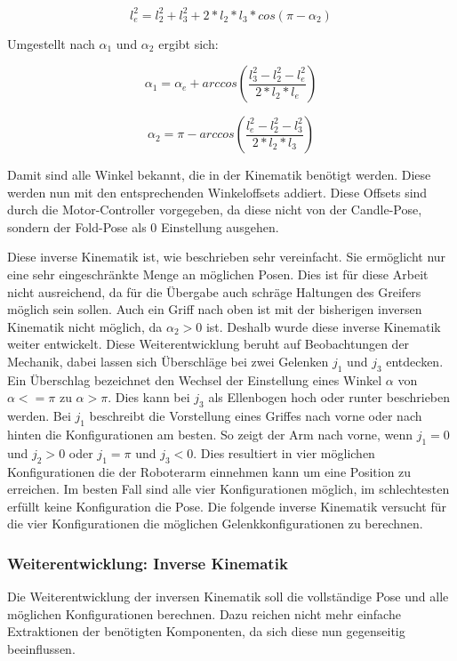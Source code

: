 \begin{equation}
l_{e}^2 = l_2^2 + l_3^2 + 2 * l_2 * l_3 * cos(\pi - \alpha_2)
\label{eq:12}
\end{equation}

Umgestellt nach $\alpha_1$ und $\alpha_2$ ergibt sich:

\begin{equation}
\alpha_1 = \alpha_{e} + arccos(\dfrac{l_3^2-l_2^2-l_{e}^2}{2*l_2*l_{e}})
\label{eq:13}
\end{equation}

\begin{equation}
\alpha_2 = \pi - arccos(\dfrac{l_{e}^2-l_2^2-l_{3}^2}{2*l_2*l_3})
\label{eq:14}
\end{equation}

Damit sind alle Winkel bekannt, die in der Kinematik benötigt werden. Diese werden nun mit den entsprechenden Winkeloffsets addiert. Diese Offsets sind durch die Motor-Controller vorgegeben, da diese nicht von der Candle-Pose, sondern der Fold-Pose als 0\textdegree{ } Einstellung ausgehen.

Diese inverse Kinematik ist, wie beschrieben sehr vereinfacht. Sie ermöglicht nur eine sehr eingeschränkte Menge an möglichen Posen. Dies ist für diese Arbeit nicht ausreichend, da für die Übergabe auch schräge Haltungen des Greifers möglich sein sollen. Auch ein Griff nach oben ist mit der bisherigen inversen Kinematik nicht möglich, da $\alpha_2 > 0$ ist. Deshalb wurde diese inverse Kinematik weiter entwickelt. Diese Weiterentwicklung beruht auf Beobachtungen der Mechanik, dabei lassen sich Überschläge bei zwei Gelenken $j_1$ und $j_3$ entdecken. Ein Überschlag bezeichnet den Wechsel der Einstellung eines Winkel $\alpha$ von $\alpha <= \pi$ zu $\alpha > \pi$. Dies kann bei $j_3$ als Ellenbogen hoch oder runter beschrieben werden. Bei $j_1$ beschreibt die Vorstellung eines Griffes nach vorne oder nach hinten die Konfigurationen am besten. So zeigt der Arm nach vorne, wenn $j_1 = 0$ und $j_2 > 0$ oder $j_1 = \pi$ und $j_3 < 0$. Dies resultiert in vier möglichen Konfigurationen die der Roboterarm einnehmen kann um eine Position zu erreichen. Im besten Fall sind alle vier Konfigurationen möglich, im schlechtesten erfüllt keine Konfiguration die Pose. Die folgende inverse Kinematik versucht für die vier Konfigurationen die möglichen Gelenkkonfigurationen zu berechnen.

\subsubsection{Weiterentwicklung: Inverse Kinematik}
Die Weiterentwicklung der inversen Kinematik soll die vollständige Pose und alle möglichen Konfigurationen berechnen. Dazu reichen nicht mehr einfache Extraktionen der benötigten Komponenten, da sich diese nun gegenseitig beeinflussen. 

